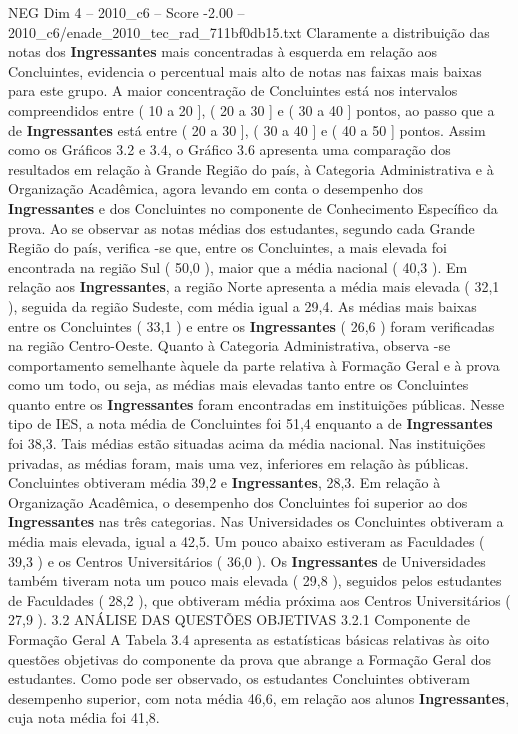 \begin{textsample}{NEG Dim 4 – 2010\_c6 – Score -2.00 – 2010\_c6/enade\_2010\_tec\_rad\_711bf0db15.txt}
Claramente a distribuição das notas dos \textbf{Ingressantes} mais concentradas à esquerda em relação aos Concluintes, evidencia o percentual mais alto de notas nas faixas mais baixas para este grupo.
A maior concentração de Concluintes está nos intervalos compreendidos entre ( 10 a 20 ], ( 20 a 30 ] e ( 30 a 40 ] pontos, ao passo que a de \textbf{Ingressantes} está entre ( 20 a 30 ], ( 30 a 40 ] e ( 40 a 50 ] pontos.
Assim como os Gráficos 3.2 e 3.4, o Gráfico 3.6 apresenta uma comparação dos resultados em relação à Grande Região do país, à Categoria Administrativa e à Organização Acadêmica, agora levando em conta o desempenho dos \textbf{Ingressantes} e dos Concluintes no componente de Conhecimento Específico da prova.
Ao se observar as notas médias dos estudantes, segundo cada Grande Região do país, verifica -se que, entre os Concluintes, a mais elevada foi encontrada na região Sul ( 50,0 ), maior que a média nacional ( 40,3 ).
Em relação aos \textbf{Ingressantes}, a região Norte apresenta a média mais elevada ( 32,1 ), seguida da região Sudeste, com média igual a 29,4.
As médias mais baixas entre os Concluintes ( 33,1 ) e entre os \textbf{Ingressantes} ( 26,6 ) foram verificadas na região Centro-Oeste.
Quanto à Categoria Administrativa, observa -se comportamento semelhante àquele da parte relativa à Formação Geral e à prova como um todo, ou seja, as médias mais elevadas tanto entre os Concluintes quanto entre os \textbf{Ingressantes} foram encontradas em instituições públicas.
Nesse tipo de IES, a nota média de Concluintes foi 51,4 enquanto a de \textbf{Ingressantes} foi 38,3.
Tais médias estão situadas acima da média nacional.
Nas instituições privadas, as médias foram, mais uma vez, inferiores em relação às públicas.
Concluintes obtiveram média 39,2 e \textbf{Ingressantes}, 28,3.
Em relação à Organização Acadêmica, o desempenho dos Concluintes foi superior ao dos \textbf{Ingressantes} nas três categorias.
Nas Universidades os Concluintes obtiveram a média mais elevada, igual a 42,5.
Um pouco abaixo estiveram as Faculdades ( 39,3 ) e os Centros Universitários ( 36,0 ).
Os \textbf{Ingressantes} de Universidades também tiveram nota um pouco mais elevada ( 29,8 ), seguidos pelos estudantes de Faculdades ( 28,2 ), que obtiveram média próxima aos Centros Universitários ( 27,9 ). 3.2 ANÁLISE DAS QUESTÕES OBJETIVAS 3.2.1 Componente de Formação Geral A Tabela 3.4 apresenta as estatísticas básicas relativas às oito questões objetivas do componente da prova que abrange a Formação Geral dos estudantes.
Como pode ser observado, os estudantes Concluintes obtiveram desempenho superior, com nota média 46,6, em relação aos alunos \textbf{Ingressantes}, cuja nota média foi 41,8.

\end{textsample}
